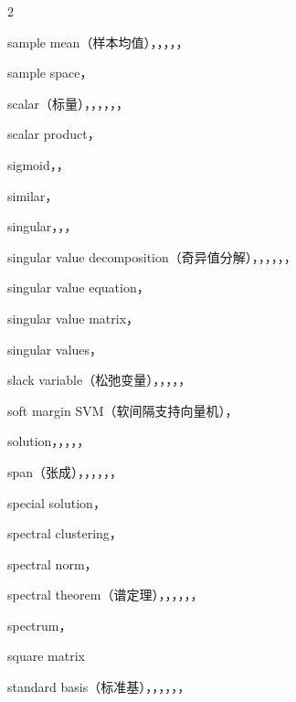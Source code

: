 \begin{multicols}{2}
\medskip{}\par\smallskip
\noindent sample mean（样本均值），，，，，\par
\noindent sample space，\par
\noindent scalar（标量），，，，，，\par
\noindent scalar product，\par
\noindent sigmoid，，\par
\noindent similar，\par
\noindent singular，，，\par
\noindent singular value decomposition（奇异值分解），，，，，，\par
\noindent singular value equation，\par
\noindent singular value matrix，\par
\noindent singular values，\par
\noindent slack variable（松弛变量），，，，，\par
\noindent soft margin SVM（软间隔支持向量机），\par
\noindent solution，，，，，\par
\noindent span（张成），，，，，，\par
\noindent special solution，\par
\noindent spectral clustering，\par
\noindent spectral norm，\par
\noindent spectral theorem（谱定理），，，，，，\par
\noindent spectrum，\par
\noindent square matrix\par
\noindent standard basis（标准基），，，，，，\par

\end{multicols}

